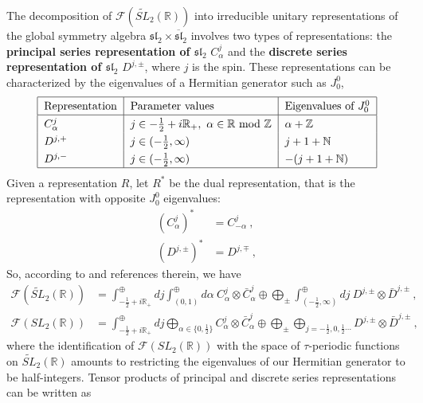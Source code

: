 \documentclass[12pt,a4paper,notitlepage]{report}
\newcommand \Z {\mathbb{Z}}
\newcommand \N {\mathbb{N}}
\newcommand \R {\mathbb{R}}
\numberwithin{equation}{section}
\theoremstyle{break}
\begin{document}
The decomposition of $\mathcal{F}(\widetilde{SL}_2(\mathbb{R}))$ into irreducible unitary representations of the global symmetry algebra $\mathfrak{sl}_2\times \overline{\mathfrak{sl}}_2$ involves two types of representations: the \textbf{\boldmath principal series representation of $\mathfrak{sl}_2$} $C^j_\alpha$ and the \textbf{\boldmath discrete series representation of $\mathfrak{sl}_2$} $D^{j,\pm}$, where $j$ is the spin. 
These representations can be characterized by the eigenvalues of a Hermitian generator such as $J_0^0$,
\begin{align} 
\renewcommand{\arraystretch}{1.3}
\begin{tabular}{|l|l|l|}
  \hline
Representation & Parameter values & Eigenvalues of $J_0^0$
\\
\hline 
$C^j_\alpha$  & $j\in -\tfrac12+i\R_+,\ \alpha\in\R\ \text{mod}\ \Z$ &  $\alpha + \Z$ 
\\
$D^{j,+}$ & $j\in(-\tfrac12,\infty)$ & $j+1+\N$
\\
$D^{j,-}$ & $j\in(-\tfrac12,\infty)$ & $-(j+1+\N)$
\\
\hline 
 \end{tabular}
\label{rpe}
\end{align}
Given a representation $R$, let $R^*$ be the dual representation, that is the representation with opposite $J_0^0$ eigenvalues:
\begin{align}
 (C^j_\alpha)^* &= C^j_{-\alpha} \ , 
\\
 (D^{j,\pm})^* &= D^{j,\mp}\ ,
\end{align}
So, according to \cite{rib09} and references therein, we have
\begin{align}
 \mathcal{F}(\widetilde{SL}_2(\mathbb{R})) &= \int^\oplus_{-\frac12+i\R_+} dj \int^\oplus_{(0,1)} d\alpha\ C^j_\alpha \otimes \bar{C}^j_{\alpha} \oplus \bigoplus_\pm \int^\oplus_{(-\frac12,\infty)} dj\ D^{j,\pm}\otimes \bar{D}^{j,\pm} \ ,
\label{fst}
\\
 \mathcal{F}(SL_2(\mathbb{R})) &= \int^\oplus_{-\frac12+i\R_+} dj \bigoplus_{\alpha\in\{0,\frac12\}} C^j_\alpha \otimes \bar{C}^j_{\alpha} \oplus \bigoplus_\pm \bigoplus_{j=-\frac12, 0,\frac12 \cdots} D^{j,\pm}\otimes \bar{D}^{j,\pm} \ ,
\end{align}
where the identification of $\mathcal{F}(SL_2(\mathbb{R}))$ with the space of $\tau$-periodic functions on $\widetilde{SL}_2(\mathbb{R})$ amounts to restricting the eigenvalues of our Hermitian generator to be half-integers. Tensor products of principal and discrete series representations can be written as 
\end{document}
